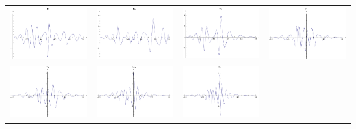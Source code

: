 \documentclass{article}
\begin{document}
\begin{landscape}
\begin{tabular}{cccc}
\includegraphics[width=5.0cm]{decic_wavelet_5.pdf}& \includegraphics[width=5.0cm]{decic_wavelet_6.pdf}& \includegraphics[width=5.0cm]{decic_wavelet_7.pdf}& \includegraphics[width=5.0cm]{decic_wavelet_8.pdf} \\
\includegraphics[width=5.0cm]{decic_wavelet_9.pdf}& \includegraphics[width=5.0cm]{decic_wavelet_10.pdf}& \includegraphics[width=5.0cm]{decic_wavelet_11.pdf}\end{tabular} 
 \end{landscape}
\end{document}
